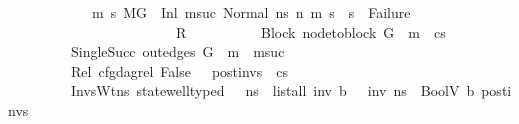 \begin{isabellebody}
\ \ \ \ \ \ \ \ \ \ \ {\isacharparenleft}{\kern0pt}{\isacharparenleft}{\kern0pt}{\isasymAnd}\ m{}{\isacharprime}{\kern0pt}\ s{}{\isacharprime}{\kern0pt}{\isachardot}{\kern0pt}\ {\isacharparenleft}{\kern0pt}{\isacharparenleft}{\kern0pt}M{\isacharcomma}{\kern0pt}{\isasymLambda}{\isacharcomma}{\kern0pt}{\isasymGamma}{\isacharcomma}{\kern0pt}{\isasymOmega}{\isacharcomma}{\kern0pt}G\ {\isasymturnstile}\ {\isacharparenleft}{\kern0pt}Inl\ m{\isacharunderscore}{\kern0pt}suc{\isacharcomma}{\kern0pt}\ Normal\ ns{}{\isacharparenright}{\kern0pt}\ {\isacharminus}{\kern0pt}n{\isasymrightarrow}{\isacharasterisk}{\kern0pt}\ {\isacharparenleft}{\kern0pt}m{}{\isacharprime}{\kern0pt}{\isacharcomma}{\kern0pt}\ s{}{\isacharprime}{\kern0pt}{\isacharparenright}{\kern0pt}{\isacharparenright}{\kern0pt}\ {\isasymLongrightarrow}\ {\isacharparenleft}{\kern0pt}s{}{\isacharprime}{\kern0pt}\ {\isasymnoteq}\ Failure{\isacharparenright}{\kern0pt}{\isacharparenright}{\kern0pt}{\isacharparenright}{\kern0pt}{\isacharparenright}{\kern0pt}{\isasymLongrightarrow}\isanewline
\ \ \ \ \ \ \ \ \ \ \ \ \ \ \ \ \ \ \ \ \ \ \ \ R{\isachardoublequoteclose}\ \isanewline
\ \ \ \ \ \ \ \ \ Block{\isacharcolon}{\kern0pt}\ {\isachardoublequoteopen}node{\isacharunderscore}{\kern0pt}to{\isacharunderscore}{\kern0pt}block\ G\ {\isacharbang}{\kern0pt}\ m\ {\isacharequal}{\kern0pt}\ cs{\isachardoublequoteclose}\ \ \isanewline
\ \ \ \ \ \ \ \ \ SingleSucc{\isacharcolon}{\kern0pt}\ {\isachardoublequoteopen}out{\isacharunderscore}{\kern0pt}edges\ G\ {\isacharbang}{\kern0pt}\ m\ {\isacharequal}{\kern0pt}\ {\isacharbrackleft}{\kern0pt}m{\isacharunderscore}{\kern0pt}suc{\isacharbrackright}{\kern0pt}{\isachardoublequoteclose}\ \isanewline
\ \ \ \ \ \ \ \ \ Rel{\isacharcolon}{\kern0pt}\ {\isachardoublequoteopen}cfg{\isacharunderscore}{\kern0pt}dag{\isacharunderscore}{\kern0pt}rel\ False\ {\isacharbrackleft}{\kern0pt}{\isacharbrackright}{\kern0pt}\ {\isacharbrackleft}{\kern0pt}{\isacharbrackright}{\kern0pt}\ post{\isacharunderscore}{\kern0pt}invs\ {\isacharbrackleft}{\kern0pt}{\isacharbrackright}{\kern0pt}\ cs{\isachardoublequoteclose}\ \isanewline
\ \ \ \ \ \ \ \ \ InvsWt{\isacharcolon}{\kern0pt}{\isachardoublequoteopen}{\isasymAnd}ns{\isachardot}{\kern0pt}\ state{\isacharunderscore}{\kern0pt}well{\isacharunderscore}{\kern0pt}typed\ {\isasymLambda}\ {\isasymOmega}\ ns\ {\isasymLongrightarrow}\ list{\isacharunderscore}{\kern0pt}all\ {\isacharparenleft}{\kern0pt}{\isasymlambda}inv{\isachardot}{\kern0pt}\ {\isasymexists}b{\isachardot}{\kern0pt}\ {\isasymLambda}{\isacharcomma}{\kern0pt}{\isasymGamma}{\isacharcomma}{\kern0pt}{\isasymOmega}\ {\isasymturnstile}\ {\isasymlangle}inv{\isacharcomma}{\kern0pt}\ ns{\isasymrangle}\ {\isasymDown}\ BoolV\ b{\isacharparenright}{\kern0pt}\ post{\isacharunderscore}{\kern0pt}invs{\isachardoublequoteclose}\isanewline

\end{isabellebody}
